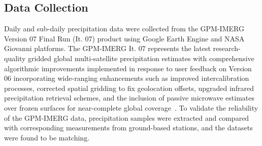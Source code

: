 \subsection{Data Collection}
Daily and sub-daily precipitation data were collected from the GPM-IMERG Version 07 Final Run (It. 07) product using Google Earth Engine and NASA Giovanni platforms.
The GPM-IMERG It. 07 represents the latest research-quality gridded global multi-satellite precipitation estimates with comprehensive algorithmic improvements implemented in response to user feedback on Version 06 incorporating wide-ranging enhancements such as improved intercalibration processes, corrected spatial gridding to fix geolocation offsets, upgraded infrared precipitation retrieval schemes, and the inclusion of passive microwave estimates over frozen surfaces for near-complete global coverage~\cite{21}.
To validate the reliability of the GPM-IMERG data, precipitation samples were extracted and compared with corresponding measurements from ground-based stations, and the datasets were found to be matching.
